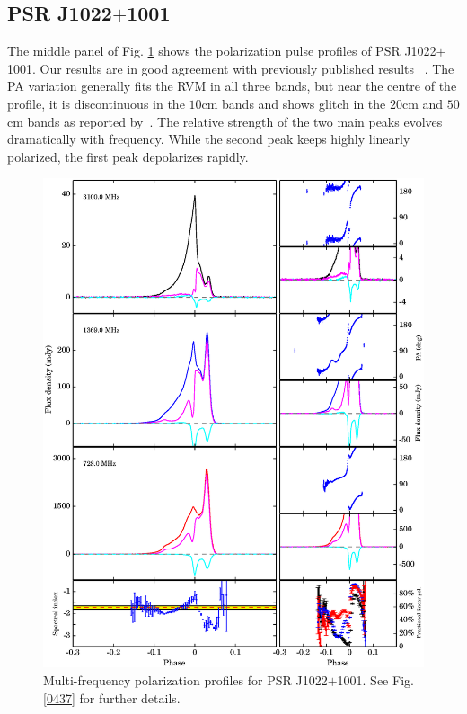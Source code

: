 \documentclass[useAMS,usenatbib]{mn2e}
\begin{document}
\subsection{PSR J1022$+$1001}

The middle panel of Fig. \ref{1022} shows the polarization pulse profiles 
of PSR J1022$+$1001.
%
Our results are in good agreement with previously published results
~\citep{1022Kramer99,Stairs99,Ord04,Yan11}.
%
The PA variation generally fits the RVM in all three bands, but near the 
centre of the profile, it is discontinuous in the $10$cm bands and shows 
glitch in the $20$cm and $50$cm bands as reported by~\citet{Yan11}.
%
The relative strength of the two main peaks evolves dramatically with 
frequency.
%
While the second peak keeps highly linearly polarized, the first peak 
depolarizes rapidly.

\begin{figure}
\begin{center}
\includegraphics[width=6 in]{1022.ps}
\caption{Multi-frequency polarization profiles for PSR J1022$+$1001. 
See Fig. \ref{0437} for further details.}
\label{1022}
\end{center}
\end{figure}
\end{document}
